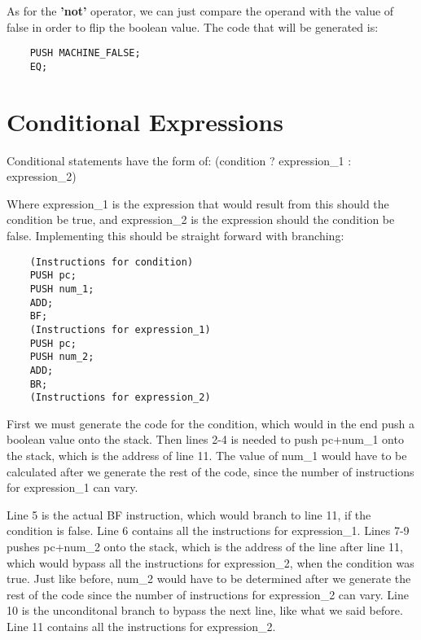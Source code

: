 \documentclass{article}
\begin{document}
As for the \textbf{'not'} operator, we can just compare the operand with the value of false in order to flip the boolean value. The code that will be generated is:

\begin{lstlisting}
    PUSH MACHINE_FALSE;
    EQ;
\end{lstlisting}

\section{Conditional Expressions}

Conditional statements have the form of: (condition ? expression\_1 : expression\_2)

Where expression\_1 is the expression that would result from this should the condition be true, and expression\_2 is the expression should the condition be false. Implementing this should be straight forward with branching:

\begin{lstlisting}
    (Instructions for condition)
    PUSH pc;
    PUSH num_1;
    ADD;
    BF;
    (Instructions for expression_1)
    PUSH pc;
    PUSH num_2;
    ADD;
    BR;
    (Instructions for expression_2)
\end{lstlisting}

First we must generate the code for the condition, which would in the end push a boolean value onto the stack. Then lines 2-4 is needed to push pc+num\_1 onto the stack, which is the address of line 11. The value of num\_1 would have to be calculated after we generate the rest of the code, since the number of instructions for expression\_1 can vary.

Line 5 is the actual BF instruction, which would branch to line 11, if the condition is false. Line 6 contains all the instructions for expression\_1. Lines 7-9 pushes pc+num\_2 onto the stack, which is the address of the line after line 11, which would bypass all the instructions for expression\_2, when the condition was true. Just like before, num\_2 would have to be determined after we generate the rest of the code since the number of instructions for expression\_2 can vary. Line 10 is the unconditonal branch to bypass the next line, like what we said before. Line 11 contains all the instructions for expression\_2.
\end{document}
